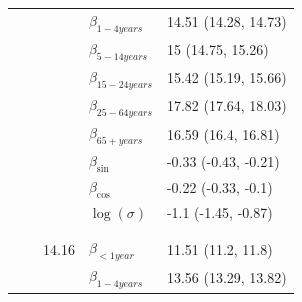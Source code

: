 \documentclass[a4paper,twoside,11pt]{report} %
\theoremstyle{definition}
\theoremstyle{definition}
\theoremstyle{definition}
\theoremstyle{definition}
\theoremstyle{remark}
\begin{document}
\begin{longtable}[t]{llrll}
\hspace{1em}\hspace{1em} &  &  & $\beta_{1-4 years}$ & 14.51 (14.28, 14.73)\\

\hspace{1em}\hspace{1em} &  &  & $\beta_{5-14 years}$ & 15 (14.75, 15.26)\\

\hspace{1em}\hspace{1em} &  &  & $\beta_{15-24 years}$ & 15.42 (15.19, 15.66)\\

\hspace{1em}\hspace{1em} &  &  & $\beta_{25-64 years}$ & 17.82 (17.64, 18.03)\\

\hspace{1em}\hspace{1em} &  &  & $\beta_{65+ years}$ & 16.59 (16.4, 16.81)\\

\hspace{1em}\hspace{1em} &  &  & $\beta_{\sin}$ & -0.33 (-0.43, -0.21)\\

\hspace{1em}\hspace{1em} &  &  & $\beta_{\cos}$ & -0.22 (-0.33, -0.1)\\

\hspace{1em}\hspace{1em} &  &  & $\log(\sigma)$ & -1.1 (-1.45, -0.87)\\
\cmidrule{1-5}
\addlinespace[0.3em]
\multicolumn{5}{l}{\textit{\textbf{Poisson Gamma}}}\\
\addlinespace[0.3em]
\multicolumn{5}{l}{\begin{math}\log(\lambda_{it})=\beta(ageGroup_{i})+\log(n_{it})\end{math}}\\
\hspace{1em}\hspace{1em} &  & 14.16 & $\beta_{<1 year}$ & 11.51 (11.2, 11.8)\\

\hspace{1em}\hspace{1em} &  &  & $\beta_{1-4 years}$ & 13.56 (13.29, 13.82)\\


\end{longtable}
\end{document}
